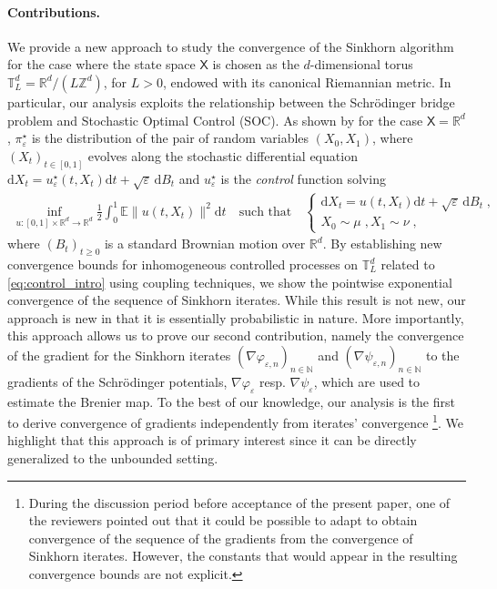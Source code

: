\documentclass[final,12pt]{colt2023} %
\def\msx{\mathsf{X}}
\def\rset{\mathbb{R}}
\newcommand{\bbRD}{\mathbb{R}^d}
\newcommand{\bes}{\begin{equation}}
\newcommand{\ees}{\end{equation}}
\newcommand{\De}{\mathrm{d}}
\def\torus{\tset}
\def\torusL{\torus_L}
\def\rset{\mathbb{R}}
\def\tset{\mathbb{T}}
\def\zset{\mathbb{Z}}
\def\nset{\mathbb{N}}
\def\eqsp{\;}
\begin{document}
\paragraph{Contributions.}

We provide a new approach to study the convergence of the Sinkhorn algorithm for the case where the state space $\msx$ is chosen as the $d$-dimensional torus $\mathbb{T}_L^d = \rset^d/(L\zset^d)$, for $L >0$, endowed with its canonical Riemannian metric. In particular, our analysis exploits the relationship between the Schr\"odinger bridge problem and Stochastic Optimal Control (SOC). As shown by \cite{LeoSch} for the case $\msx=\bbRD$, $\pi_\varepsilon^\star$ is the distribution of the pair of random variables $(X_0,X_1)$, where $(X_t)_{t \in[0,1]}$ evolves along the stochastic differential equation $\De X_t=u_\varepsilon^\star(t,X_t) \De t + \sqrt{\varepsilon} \,\De B_t$ and $u_\varepsilon^\star$ is the \textit{control} function solving  
  \bes
  \label{eq:control_intro}
\begin{split}
  \inf_{u: [0,1] \times \bbRD \to \bbRD} \frac12\int_0^1 \mathbb{E}\|u(t,X_t)\|^2 \De t\quad\text{such that}\quad
\begin{cases}\De X_t=u(t,X_t) \De t + \sqrt{\varepsilon} \,\De B_t \eqsp,\\
  X_0\sim \mu \eqsp, X_1\sim \nu \eqsp,
\end{cases}
\end{split}
\ees
where $(B_t)_{t \geq 0}$ is a standard Brownian motion over $\bbRD$.
By establishing new convergence bounds for inhomogeneous controlled processes on $\torusL^d$ related to \eqref{eq:control_intro} using coupling techniques, we show the pointwise exponential convergence of the sequence of Sinkhorn iterates. While this result is not new, our approach is new in that it is essentially probabilistic in nature.
More importantly, this approach allows us to prove our second contribution, namely the convergence of the gradient for the Sinkhorn iterates $(\nabla \varphi_{\varepsilon,n})_{n \in\nset}$ and $(\nabla \psi_{\varepsilon,n})_{n \in\nset}$ to the gradients of the Schr\"odinger potentials, $\nabla \varphi_{\varepsilon}$ resp. $\nabla \psi_{\varepsilon}$, which are used to estimate the Brenier map.  
To the best of our knowledge, our analysis is the first to derive convergence of gradients independently from iterates' convergence \footnote{During the discussion period before acceptance of the present paper, one of the reviewers pointed out that it could be possible to adapt \cite[Lemma 4.8]{delBarrio2022} to obtain convergence of the sequence of the gradients from the convergence of Sinkhorn iterates. However, the constants that would appear in the resulting convergence bounds are not explicit.}. We highlight that this approach is of primary interest since it can be directly generalized to the unbounded setting.
\end{document}
